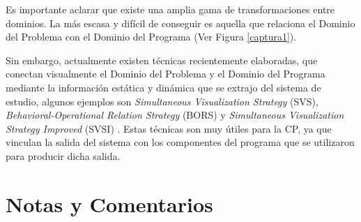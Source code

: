 Es importante aclarar que existe una amplia gama de transformaciones entre dominios. La más escasa y difícil de conseguir es aquella que relaciona el Dominio del Problema con el Dominio del Programa (Ver Figura \ref{captura1}).

Sin embargo, actualmente existen técnicas recientemente elaboradas, que conectan visualmente el Dominio del Problema y el Dominio del Programa mediante la información estática y dinámica que se extrajo del sistema de estudio, algunos ejemplos son \textit{Simultaneous Visualization Strategy} (SVS), \textit{Behavioral-Operational Relation Strategy} (BORS) y \textit{Simultaneous Visualization Strategy Improved} (SVSI) \cite{BRM10,MPMR07,MBPHRU10}. Estas técnicas son muy útiles para la CP, ya que vinculan la salida del sistema con los componentes del programa que se utilizaron para producir dicha salida.




\pagebreak
\section{Notas y Comentarios}

